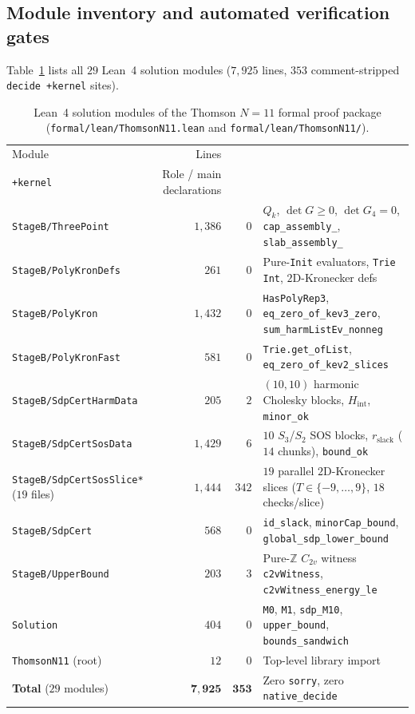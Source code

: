 \documentclass[11pt,reqno]{amsart}
\let\origunderscore\_
\renewcommand{\_}{\origunderscore\allowbreak}
\theoremstyle{definition}
\newcommand{\Z}{\mathbb{Z}}
\begin{document}
\subsection{Module inventory and automated verification gates}\label{subsec:gates}
Table~\ref{tab:modules} lists all $29$ Lean~4 solution modules ($7{,}925$ lines, $353$ comment-stripped \texttt{decide +kernel} sites).

\begin{table}[htbp]
  \centering
  \caption{Lean~4 solution modules of the Thomson $N = 11$ formal proof package (\texttt{formal/\allowbreak lean/\allowbreak ThomsonN11.lean} and \texttt{formal/\allowbreak lean/\allowbreak ThomsonN11/}).}
  \label{tab:modules}
  \footnotesize
  \renewcommand{\arraystretch}{1.10}
  \begin{tabular}{@{}>{\raggedright\arraybackslash}p{4.0cm}rr>{\raggedright\arraybackslash}p{7.2cm}@{}}
    \toprule
    Module & Lines & \shortstack[r]{\texttt{decide}\\\texttt{+kernel}} & Role / main declarations \\
    \midrule
    \texttt{StageB/ThreePoint} & $1{,}386$ & $0$ & $Q_k$, $\det G \ge 0$, $\det G_4 = 0$, \texttt{cap\_assembly\_11}, \texttt{slab\_assembly\_11} \\
    \texttt{StageB/PolyKronDefs} & $261$ & $0$ & Pure-\texttt{Init} evaluators, \texttt{Trie Int}, $2\text{D}$-Kronecker defs \\
    \texttt{StageB/PolyKron} & $1{,}432$ & $0$ & \texttt{HasPolyRep3}, \texttt{eq\_zero\_of\_kev3\_zero}, \texttt{sum\_harmListEv\_nonneg} \\
    \texttt{StageB/PolyKronFast} & $581$ & $0$ & \texttt{Trie.get\_ofList}, \texttt{eq\_zero\_of\_kev2\_slices} \\
    \texttt{StageB/SdpCertHarmData} & $205$ & $2$ & $(10,10)$ harmonic Cholesky blocks, $H_{\mathrm{int}}$, \texttt{minor\origunderscore ok} \\
    \texttt{StageB/SdpCertSosData} & $1{,}429$ & $6$ & $10$ $S_3$/$S_2$ SOS blocks, $r_{\mathrm{slack}}$ ($14$ chunks), \texttt{bound\origunderscore ok} \\
    \texttt{StageB/SdpCertSosSlice*} ($19$ files) & $1{,}444$ & $342$ & $19$ parallel $2\text{D}$-Kronecker slices ($T \in \{-9,\dots,9\}$, $18$ checks/slice) \\
    \texttt{StageB/SdpCert} & $568$ & $0$ & \texttt{id\_slack}, \texttt{minorCap\_bound}, \texttt{global\_sdp\_lower\_bound} \\
    \texttt{StageB/UpperBound} & $203$ & $3$ & Pure-$\Z$ $C_{2v}$ witness \texttt{c2vWitness}, \texttt{c2vWitness\_energy\_le} \\
    \midrule
    \texttt{Solution} & $404$ & $0$ & \texttt{M0}, \texttt{M1}, \texttt{sdp\_M10}, \texttt{upper\_bound}, \texttt{bounds\_sandwich} \\
    \texttt{ThomsonN11} (root) & $12$ & $0$ & Top-level library import \\
    \midrule
    \textbf{Total} ($29$ modules) & $\mathbf{7{,}925}$ & $\mathbf{353}$ & Zero \texttt{sorry}, zero \texttt{native\_decide} \\
    \bottomrule
  \end{tabular}
\end{table}
\end{document}
